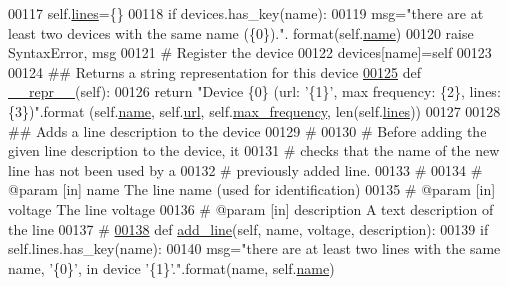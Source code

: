 \begin{DoxyCode}
00117         self.\hyperlink{classsettings__classes_1_1_device_a22ea78f101680108434cb132f12afa0a}{lines}=\{\}
00118         \textcolor{keywordflow}{if} devices.has\_key(name):
00119             msg=\textcolor{stringliteral}{"there are at least two devices with the same name (\{0\})."}.
      format(self.\hyperlink{classsettings__classes_1_1_device_ab74e6bf80237ddc4109968cedc58c151}{name})
00120             \textcolor{keywordflow}{raise} SyntaxError, msg
00121         \textcolor{comment}{# Register the device}
00122         devices[name]=self
00123 
00124     \textcolor{comment}{## Returns a string representation for this device}
\hypertarget{settings__classes_8py_source_l00125}{}\hyperlink{classsettings__classes_1_1_device_ad8b9328939df072e4740cd9a63189744}{00125}     \textcolor{keyword}{def }\hyperlink{classsettings__classes_1_1_device_ad8b9328939df072e4740cd9a63189744}{__repr__}(self):
00126         \textcolor{keywordflow}{return} \textcolor{stringliteral}{"Device \{0\} (url: '\{1\}', max frequency: \{2\}, lines: \{3\})"}.format
      (self.\hyperlink{classsettings__classes_1_1_device_ab74e6bf80237ddc4109968cedc58c151}{name}, self.\hyperlink{classsettings__classes_1_1_device_afcd5a3e84f2adb7f83fa6c99911f31e4}{url}, self.\hyperlink{classsettings__classes_1_1_device_a22b4066c76c38dbb99a2ef57fc220fb8}{max_frequency}, len(self.\hyperlink{classsettings__classes_1_1_device_a22ea78f101680108434cb132f12afa0a}{lines}))
00127 
00128     \textcolor{comment}{## Adds a line description to the device}
00129     \textcolor{comment}{#}
00130     \textcolor{comment}{#  Before adding the given line description to the device, it}
00131     \textcolor{comment}{#  checks that the name of the new line has not been used by a}
00132     \textcolor{comment}{#  previously added line.}
00133     \textcolor{comment}{#}
00134     \textcolor{comment}{# @param [in] name        The line name (used for identification)}
00135     \textcolor{comment}{# @param [in] voltage     The line voltage}
00136     \textcolor{comment}{# @param [in] description A text description of the line}
00137     \textcolor{comment}{#}
\hypertarget{settings__classes_8py_source_l00138}{}\hyperlink{classsettings__classes_1_1_device_a9b24e7f6a176430603b1aec4ead55473}{00138}     \textcolor{keyword}{def }\hyperlink{classsettings__classes_1_1_device_a9b24e7f6a176430603b1aec4ead55473}{add_line}(self, name, voltage, description):
00139         \textcolor{keywordflow}{if} self.lines.has\_key(name):
00140             msg=\textcolor{stringliteral}{"there are at least two lines with the same name, '\{0\}', in
       device '\{1\}'."}.format(name, self.\hyperlink{classsettings__classes_1_1_device_ab74e6bf80237ddc4109968cedc58c151}{name})

\end{DoxyCode}
